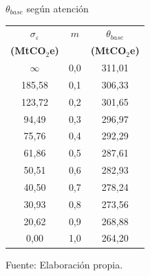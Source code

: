 \documentclass[xcolor=dvipsnames]{beamer}
\begin{document}
\begin{frame}{$\theta_{base}$ según atención}

\centering

\small %

\renewcommand{\arraystretch}{1.05}
\setlength{\tabcolsep}{8pt}

\begin{tabular}{c c c}
\toprule
\textbf{$\sigma_{\varepsilon}$} & \textbf{$m$} & \textbf{$\theta_{base}$} \\
\textbf{(MtCO$_2$e)} & & \textbf{(MtCO$_2$e)} \\
\midrule
$\infty$ & 0,0 & 311,01 \\
185,58 & 0,1 & 306,33 \\
123,72 & 0,2 & 301,65 \\
94,49  & 0,3 & 296,97 \\
75,76  & 0,4 & 292,29 \\
61,86  & 0,5 & 287,61 \\
50,51  & 0,6 & 282,93 \\
40,50  & 0,7 & 278,24 \\
30,93  & 0,8 & 273,56 \\
20,62  & 0,9 & 268,88 \\
0,00   & 1,0 & 264,20 \\
\bottomrule
\end{tabular}

\vspace{0.25cm}

\footnotesize{Fuente: Elaboración propia.}

\end{frame}
\end{document}
